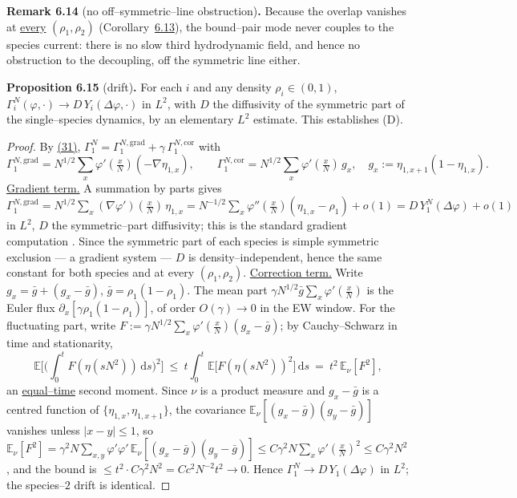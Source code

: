 \documentclass[11pt]{article}
\theoremstyle{plain}
\theoremstyle{definition}
\theoremstyle{remark}
\newcommand{\E}{\mathbb{E}}\newcommand{\PP}{\mathbb{P}}\newcommand{\dd}{\,\mathrm{d}}
\begin{document}
\label{rem_offline}\noindent\textbf{Remark 6.14} (no off--symmetric--line obstruction)\textbf{.} 
Because the overlap vanishes at \underline{every} $(\rho_1,\rho_2)$ (Corollary~\hyperref[prop_sym]{6.13}),
the bound--pair mode never couples to the species current: there is no slow third
hydrodynamic field, and hence no obstruction to the decoupling, off the symmetric line
either.
\par

\label{prop_drift}\noindent\textbf{Proposition 6.15} (drift)\textbf{.} 
For each $i$ and any density $\rho_i\in(0,1)$,
$\Gamma_i^N(\varphi,\cdot)\to D\,Y_i(\Delta\varphi,\cdot)$ in $L^2$, with $D$ the
diffusivity of the symmetric part of the single--species dynamics, by an elementary
$L^2$ estimate. This establishes \textup{(D)}.
\par
\begin{proof}
By \hyperref[eq_Wgrad]{(31)}, $\Gamma_1^N=\Gamma_1^{N,\mathrm{grad}}+\gamma\,\Gamma_1^{N,\mathrm{cor}}$
with
\[
  \Gamma_1^{N,\mathrm{grad}}=N^{1/2}\sum_x\varphi'(\tfrac xN)(-\nabla\eta_{1,x}),\qquad
  \Gamma_1^{N,\mathrm{cor}}=N^{1/2}\sum_x\varphi'(\tfrac xN)\,g_x,\quad g_x:=\eta_{1,x+1}(1-\eta_{1,x}).
\]
\underline{Gradient term.} A summation by parts gives
$\Gamma_1^{N,\mathrm{grad}}=N^{1/2}\sum_x(\nabla\varphi')(\tfrac xN)\,\eta_{1,x}
 =N^{-1/2}\sum_x\varphi''(\tfrac xN)(\eta_{1,x}-\rho_1)+o(1)=D\,Y_1^N(\Delta\varphi)+o(1)$
in $L^2$, $D$ the symmetric--part diffusivity; this is the standard gradient
computation \cite[Ch.~11]{KL}. Since the symmetric part of each species is simple
symmetric exclusion --- a gradient system --- $D$ is density--independent, hence the same
constant for both species and at every $(\rho_1,\rho_2)$.
\underline{Correction term.} Write $g_x=\bar g+(g_x-\bar g)$, $\bar g=\rho_1(1-\rho_1)$. The mean
part $\gamma N^{1/2}\bar g\sum_x\varphi'(\tfrac xN)$ is the Euler flux
$\partial_x[\gamma\rho_1(1-\rho_1)]$, of order $O(\gamma)\to0$ in the EW window. For the
fluctuating part, write $F:=\gamma N^{1/2}\sum_x\varphi'(\tfrac xN)(g_x-\bar g)$; by
Cauchy--Schwarz in time and stationarity,
\[
  \E\Big[\Big(\int_0^t F(\eta(sN^2))\dd s\Big)^2\Big]
  \ \le\ t\int_0^t\E\big[F(\eta(sN^2))^2\big]\dd s\ =\ t^2\,\E_\nu[F^2],
\]
an \underline{equal--time} second moment. Since $\nu$ is a product measure and $g_x-\bar g$
is a centred function of $\{\eta_{1,x},\eta_{1,x+1}\}$, the covariance
$\E_\nu[(g_x-\bar g)(g_y-\bar g)]$ vanishes unless $|x-y|\le1$, so
$\E_\nu[F^2]=\gamma^2N\sum_{x,y}\varphi'\varphi'\,\E_\nu[(g_x-\bar g)(g_y-\bar g)]
\le C\gamma^2N\sum_x\varphi'(\tfrac xN)^2\le C\gamma^2N^2$, and the bound is
$\le t^2\cdot C\gamma^2N^2=Cc^2N^{-2}t^2\to0$. Hence $\Gamma_1^N\to D\,Y_1(\Delta\varphi)$
in $L^2$; the species--$2$ drift is identical.
\end{proof}
\end{document}
